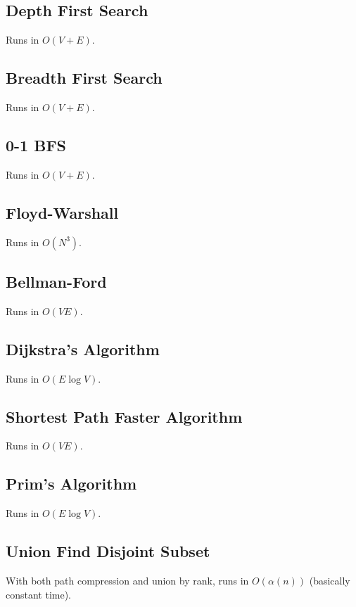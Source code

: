 \documentclass{article}
\begin{document}
\subsection{Depth First Search}
Runs in $O(V + E)$.


\subsection{Breadth First Search}
Runs in $O(V + E)$.


\subsection{0-1 BFS}
Runs in $O(V + E)$.


\subsection{Floyd-Warshall}
Runs in $O(N^3)$.


\subsection{Bellman-Ford}
Runs in $O(VE)$.


\subsection{Dijkstra's Algorithm}
Runs in $O(E \log V)$.


\subsection{Shortest Path Faster Algorithm}
Runs in $O(VE)$.


\subsection{Prim's Algorithm}
Runs in $O(E \log V)$.


\subsection{Union Find Disjoint Subset}
With both path compression and union by rank, runs in $O(\alpha(n))$ (basically constant time).

\end{document}
